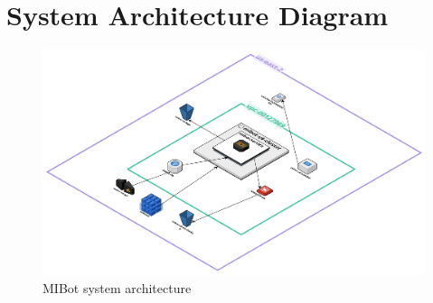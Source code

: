 \chapter{System Architecture Diagram}
\label{app:architecture-diagrams}

\begin{figure}[h!]
	\centering
	\includegraphics[width=0.99\linewidth]{fig/3bc60efd-554e-416c-87c9-8e19116d1634.pdf}
	\caption{MIBot system architecture}
	\label{fig:mibot-sys-arch}
\end{figure}